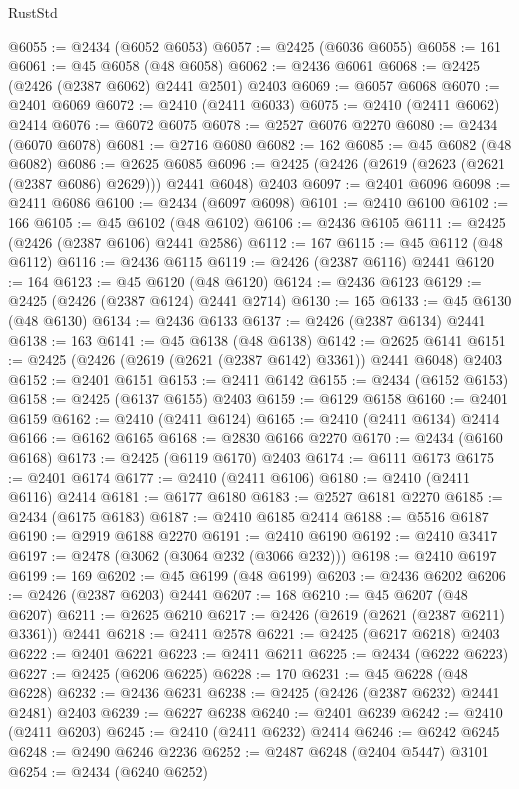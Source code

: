 \begin{lexlean}{RustStd}
\begin{coremodule}
@6055 := @2434 (@6052 @6053)
@6057 := @2425 (@6036 @6055)
@6058 := 161
@6061 := @45 @6058 (@48 @6058)
@6062 := @2436 @6061
@6068 := @2425 (@2426 (@2387 @6062) @2441 @2501) @2403
@6069 := @6057 @6068
@6070 := @2401 @6069
@6072 := @2410 (@2411 @6033)
@6075 := @2410 (@2411 @6062) @2414
@6076 := @6072 @6075
@6078 := @2527 @6076 @2270
@6080 := @2434 (@6070 @6078)
@6081 := @2716 @6080
@6082 := 162
@6085 := @45 @6082 (@48 @6082)
@6086 := @2625 @6085
@6096 := @2425 (@2426 (@2619 (@2623 (@2621 (@2387 @6086) @2629))) @2441 @6048) @2403
@6097 := @2401 @6096
@6098 := @2411 @6086
@6100 := @2434 (@6097 @6098)
@6101 := @2410 @6100
@6102 := 166
@6105 := @45 @6102 (@48 @6102)
@6106 := @2436 @6105
@6111 := @2425 (@2426 (@2387 @6106) @2441 @2586)
@6112 := 167
@6115 := @45 @6112 (@48 @6112)
@6116 := @2436 @6115
@6119 := @2426 (@2387 @6116) @2441
@6120 := 164
@6123 := @45 @6120 (@48 @6120)
@6124 := @2436 @6123
@6129 := @2425 (@2426 (@2387 @6124) @2441 @2714)
@6130 := 165
@6133 := @45 @6130 (@48 @6130)
@6134 := @2436 @6133
@6137 := @2426 (@2387 @6134) @2441
@6138 := 163
@6141 := @45 @6138 (@48 @6138)
@6142 := @2625 @6141
@6151 := @2425 (@2426 (@2619 (@2621 (@2387 @6142) @3361)) @2441 @6048) @2403
@6152 := @2401 @6151
@6153 := @2411 @6142
@6155 := @2434 (@6152 @6153)
@6158 := @2425 (@6137 @6155) @2403
@6159 := @6129 @6158
@6160 := @2401 @6159
@6162 := @2410 (@2411 @6124)
@6165 := @2410 (@2411 @6134) @2414
@6166 := @6162 @6165
@6168 := @2830 @6166 @2270
@6170 := @2434 (@6160 @6168)
@6173 := @2425 (@6119 @6170) @2403
@6174 := @6111 @6173
@6175 := @2401 @6174
@6177 := @2410 (@2411 @6106)
@6180 := @2410 (@2411 @6116) @2414
@6181 := @6177 @6180
@6183 := @2527 @6181 @2270
@6185 := @2434 (@6175 @6183)
@6187 := @2410 @6185 @2414
@6188 := @5516 @6187
@6190 := @2919 @6188 @2270
@6191 := @2410 @6190
@6192 := @2410 @3417
@6197 := @2478 (@3062 (@3064 @232 (@3066 @232)))
@6198 := @2410 @6197
@6199 := 169
@6202 := @45 @6199 (@48 @6199)
@6203 := @2436 @6202
@6206 := @2426 (@2387 @6203) @2441
@6207 := 168
@6210 := @45 @6207 (@48 @6207)
@6211 := @2625 @6210
@6217 := @2426 (@2619 (@2621 (@2387 @6211) @3361)) @2441
@6218 := @2411 @2578
@6221 := @2425 (@6217 @6218) @2403
@6222 := @2401 @6221
@6223 := @2411 @6211
@6225 := @2434 (@6222 @6223)
@6227 := @2425 (@6206 @6225)
@6228 := 170
@6231 := @45 @6228 (@48 @6228)
@6232 := @2436 @6231
@6238 := @2425 (@2426 (@2387 @6232) @2441 @2481) @2403
@6239 := @6227 @6238
@6240 := @2401 @6239
@6242 := @2410 (@2411 @6203)
@6245 := @2410 (@2411 @6232) @2414
@6246 := @6242 @6245
@6248 := @2490 @6246 @2236
@6252 := @2487 @6248 (@2404 @5447) @3101
@6254 := @2434 (@6240 @6252)

\end{coremodule}
\end{lexlean}
